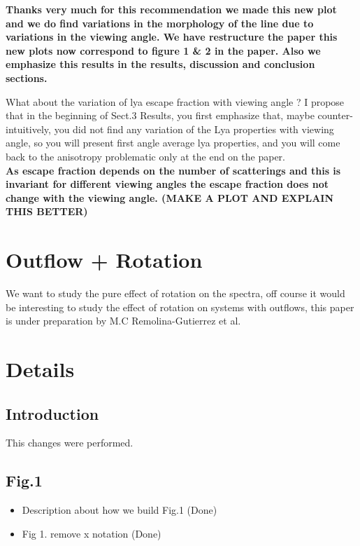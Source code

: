 \documentclass[12pt]{article}
\begin{document}
\textbf{Thanks very much for this recommendation we made this new plot and we do find variations in the morphology of the line due to variations in the viewing angle. We have restructure the paper this new plots now correspond to figure 1 & 2 in the paper.  Also we emphasize this results in the results, discussion and conclusion sections.\\}

What about the variation of lya escape fraction with viewing angle ? I propose that in the beginning of Sect.3 Results, you first emphasize that, maybe counter-intuitively, you did not find any variation of the Lya properties with viewing angle, so you will present first angle average lya properties, and you will come back to the anisotropy problematic only at the end on the paper.\\

\textbf{As escape fraction depends on the number of scatterings and this is invariant for different viewing angles the escape fraction does not change with the viewing angle. (MAKE A PLOT AND EXPLAIN THIS BETTER)
}


\section*{Outflow + Rotation}

We want to study the pure effect of rotation on the spectra, off course it would
be interesting to study the effect of rotation on systems with outflows, this paper
is under preparation by M.C Remolina-Gutierrez et al.  

\section*{Details}

\subsection*{Introduction}

This changes were performed.

\subsection*{Fig.1}

\begin{itemize}
\item Description about how we build Fig.1 (Done)
\item Fig 1. remove x notation (Done)
\end{itemize}
\end{document}
